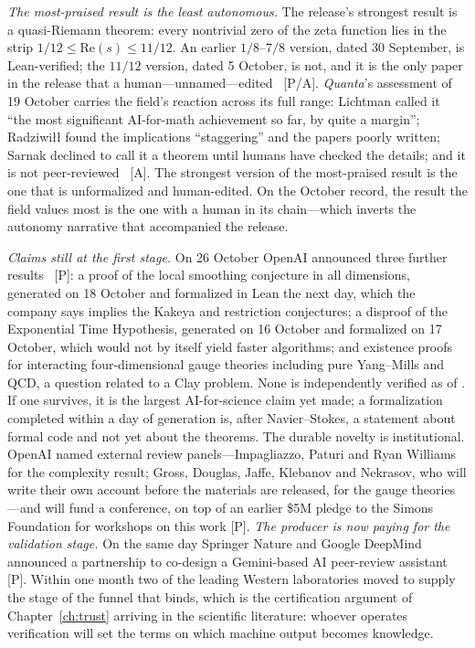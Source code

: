 \emph{The most-praised result is the least autonomous.} The release's strongest result is a quasi-Riemann theorem: every nontrivial zero of the zeta function lies in the strip $1/12 \le \mathrm{Re}(s) \le 11/12$. An earlier $1/8$--$7/8$ version, dated 30 September, is Lean-verified; the $11/12$ version, dated 5 October, is not, and it is the only paper in the release that a human---unnamed---edited~\cite{sci-quanta-qrh} [P/A]. \emph{Quanta}'s assessment of 19 October carries the field's reaction across its full range: Lichtman called it ``the most significant AI-for-math achievement so far, by quite a margin''; Radziwi\l\l{} found the implications ``staggering'' and the papers poorly written; Sarnak declined to call it a theorem until humans have checked the details; and it is not peer-reviewed~\cite{sci-quanta-qrh} [A]. The strongest version of the most-praised result is the one that is unformalized and human-edited. On the October record, the result the field values most is the one with a human in its chain---which inverts the autonomy narrative that accompanied the release.

\emph{Claims still at the first stage.} On 26 October OpenAI announced three further results~\cite{sci-openai-oct26} [P]: a proof of the local smoothing conjecture in all dimensions, generated on 18 October and formalized in Lean the next day, which the company says implies the Kakeya and restriction conjectures; a disproof of the Exponential Time Hypothesis, generated on 16 October and formalized on 17 October, which would not by itself yield faster algorithms; and existence proofs for interacting four-dimensional gauge theories including pure Yang--Mills and QCD, a question related to a Clay problem. None is independently verified as of \datafreeze. If one survives, it is the largest AI-for-science claim yet made; a formalization completed within a day of generation is, after Navier--Stokes, a statement about formal code and not yet about the theorems. The durable novelty is institutional. OpenAI named external review panels---Impagliazzo, Paturi and Ryan Williams for the complexity result; Gross, Douglas, Jaffe, Klebanov and Nekrasov, who will write their own account before the materials are released, for the gauge theories---and will fund a conference, on top of an earlier \$5M pledge to the Simons Foundation for workshops on this work [P]. \emph{The producer is now paying for the validation stage.} On the same day Springer Nature and Google DeepMind announced a partnership to co-design a Gemini-based AI peer-review assistant~\cite{sci-springer-gdm} [P]. Within one month two of the leading Western laboratories moved to supply the stage of the funnel that binds, which is the certification argument of Chapter~\ref{ch:trust} arriving in the scientific literature: whoever operates verification will set the terms on which machine output becomes knowledge.

